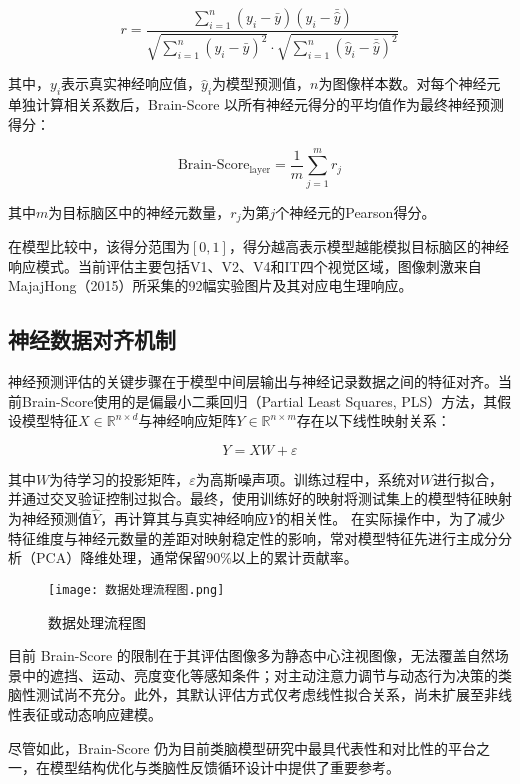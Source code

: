 \begin{equation}
	r = 
	\frac{
		\sum_{i=1}^{n}(y_i - \bar{y})(\hat{y}_i - \bar{\hat{y}})
	}{
		\sqrt{\sum_{i=1}^{n}(y_i - \bar{y})^2} \cdot \sqrt{\sum_{i=1}^{n}(\hat{y}_i - \bar{\hat{y}})^2}
	}
	\label{eq:pearson}
\end{equation}

其中，$y_i$表示真实神经响应值，$\hat{y}_i$为模型预测值，$n$为图像样本数。对每个神经元单独计算相关系数后，Brain-Score 以所有神经元得分的平均值作为最终神经预测得分：

\begin{equation}
	\text{Brain-Score}_{\text{layer}} = \frac{1}{m} \sum_{j=1}^{m} r_j
	\label{eq:brain_score}
\end{equation}

其中$m$为目标脑区中的神经元数量，$r_j$为第$j$个神经元的Pearson得分。

在模型比较中，该得分范围为$[0, 1]$，得分越高表示模型越能模拟目标脑区的神经响应模式。当前评估主要包括V1、V2、V4和IT四个视觉区域，图像刺激来自MajajHong（2015）所采集的92幅实验图片及其对应电生理响应。

\subsection{神经数据对齐机制}

神经预测评估的关键步骤在于模型中间层输出与神经记录数据之间的特征对齐。当前Brain-Score使用的是偏最小二乘回归（Partial Least Squares, PLS）方法，其假设模型特征$X \in \mathbb{R}^{n \times d}$与神经响应矩阵$Y \in \mathbb{R}^{n \times m}$存在以下线性映射关系：

\begin{equation}
	Y = XW + \varepsilon
	\label{eq:linear_model}
\end{equation}

其中$W$为待学习的投影矩阵，$\varepsilon$为高斯噪声项。训练过程中，系统对$W$进行拟合，并通过交叉验证控制过拟合。最终，使用训练好的映射将测试集上的模型特征映射为神经预测值$\hat{Y}$，再计算其与真实神经响应$Y$的相关性。
在实际操作中，为了减少特征维度与神经元数量的差距对映射稳定性的影响，常对模型特征先进行主成分分析（PCA）降维处理，通常保留90\%以上的累计贡献率。

\begin{figure}[hbt]
	\centering
	\texttt{[image: 数据处理流程图.png]}
	\caption{数据处理流程图}
	\label{f.sjcllct}
\end{figure}

目前 Brain-Score 的限制在于其评估图像多为静态中心注视图像，无法覆盖自然场景中的遮挡、运动、亮度变化等感知条件；对主动注意力调节与动态行为决策的类脑性测试尚不充分。此外，其默认评估方式仅考虑线性拟合关系，尚未扩展至非线性表征或动态响应建模。

尽管如此，Brain-Score 仍为目前类脑模型研究中最具代表性和对比性的平台之一，在模型结构优化与类脑性反馈循环设计中提供了重要参考。
